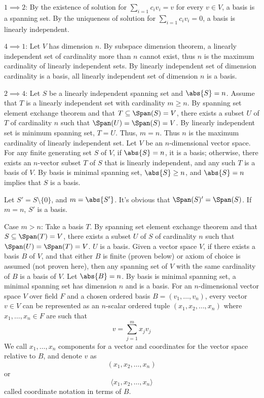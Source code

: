 \documentclass[a4paper,12pt]{report}
\begin{document}
$1\implies 2$: By the existence of solution for $\sum_{i=1}c_iv_i=v$ for every $v\in V$, a basis is a spanning set. By the uniqueness of solution for $\sum_{i=1}c_iv_i=0$, a basis is linearly independent.

$4\implies 1$: Let $V$ has dimension $n$. By subspace dimension theorem, a linearly independent set of cardinality more than $n$ cannot exist, thus $n$ is the maximum cardinality of linearly independent sets. By linearly independent set of dimension cardinality is a basis, all linearly independent set of dimension $n$ is a basis.

$2\implies 4$: Let $S$ be a linearly independent spanning set and $\abs{S}=n$. Assume that $T$ is a linearly independent set with cardinality $m\ge n$. By spanning set element exchange theorem and that $T\subseteq\Span(S)=V$, there exists a subset $U$ of $T$ of cardinality $n$ such that $\Span(U)=\Span(S)=V$. By linearly independent set is minimum spanning set, $T=U$. Thus, $m=n$. Thus $n$ is the maximum cardinality of linearly independent set.
\epr
{}
Let $V$ be an $n$-dimensional vector space. For any finite generating set $S$ of $V$, if $\abs{S}=n$, it is a basis; otherwise, there exists an $n$-vector subset $T$ of $S$ that is linearly independent, and any such $T$ is a basis of $V$.
\bpr
By basis is minimal spanning set, $\abs{S}\ge n$, and $\abs{S}=n$ implies that $S$ is a basis.

Let $S'=S\setminus\{0\}$, and $m=\abs{S'}$. It's obvious that $\Span(S)'=\Span(S)$. If $m=n$, $S'$ is a basis.

Case $m>n$: Take a basis $T$. By spanning set element exchange theorem and that $S\subseteq\Span(T)=V$, there exists a subset $U$ of $S$ of cardinality $n$ such that $\Span(U)=\Span(T)=V$. $U$ is a basis.
\epr
{}
Given a vector space $V$, if there exists a basis $B$ of $V$, and that either $B$ is finite (proven below) or axiom of choice is assumed (not proven here), then any spanning set of $V$ with the same cardinality of $B$ is a basis of $V$.
\bpr
Let $\abs{B}=n$. By basis is minimal spanning set, a minimal spanning set has dimension $n$ and is a basis.
\epr
{}
For an $n$-dimensional vector space $V$ over field $F$ and a chosen ordered basis $B=(v_1,\ldots,v_n)$, every vector $v\in V$ can be represented as an $n$-scalar ordered tuple $(x_1,x_2,\ldots,x_n)$ where $x_1,\ldots,x_n\in F$ are such that
\[v=\sum_{j=1}^mx_jv_j\]
We call $x_1,\ldots,x_n$ components for a vector and coordinates for the vector space relative to $B$, and denote $v$ as
\[(x_1,x_2,\ldots,x_n)\]
or
\[\langle x_1,x_2,\ldots,x_n\rangle\]
called coordinate notation in terms of $B$.
\end{document}
